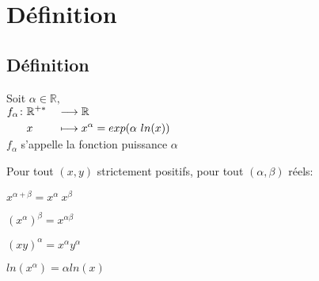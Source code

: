 \documentclass[12pt,twoside,a4paper]{article}
\author{MPSI 2}
\begin{document}
	\maketitle
	\section{D\'efinition}
		\subsection{D\'efinition}
			\begin{defi}
				Soit $\alpha\in\mathbb{R},$\\
				$\fonction{f_\alpha}{\mathbb{R}^{+*}}{\mathbb{R}}{x}{x^\alpha=exp(\alpha\ ln(x))}$\\
				$f_\alpha$ s'appelle la fonction puissance $\alpha$
			\end{defi}
			\begin{prop}
				Pour tout $(x,y)$ strictement positifs, pour tout $(\alpha,\beta)$ r\'eels:\\
				\begin{liste}
					\item $x^{\alpha+\beta}=x^\alpha\ x^\beta$
					\item $\left(x^\alpha\right)^\beta=x^{\alpha\beta}$
					\item $(xy)^\alpha=x^\alpha y^\alpha$
					\item $ln\left(x^\alpha\right)=\alpha ln(x)$
				\end{liste}
			\end{prop}
\end{document}
